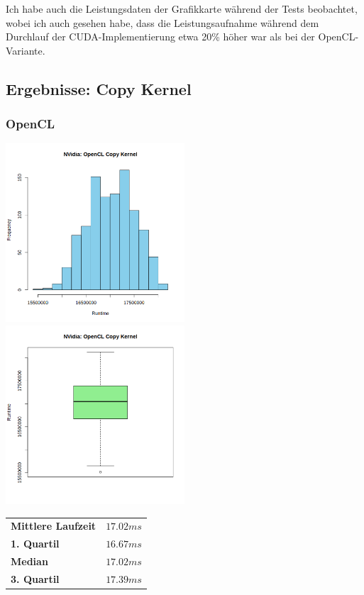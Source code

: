 \documentclass[12pt]{article}
\begin{document}
	Ich habe auch die Leistungsdaten der Grafikkarte während der Tests beobachtet, wobei ich auch gesehen habe, dass die Leistungsaufnahme während dem Durchlauf der CUDA-Implementierung etwa 20\% höher war als bei der OpenCL-Variante.
	
	

	\subsection*{Ergebnisse: Copy Kernel}
	\subsubsection*{OpenCL}
	\includegraphics[width=0.5\textwidth]{../statistics/nvidia/opencl/histogram_copy.png}
	\includegraphics[width=0.5\textwidth]{../statistics/nvidia/opencl/boxplot_copy.png}
	\\
	\begin{center}
		\begin{tabular}{|l|l|}
			\toprule
			\textbf{Mittlere Laufzeit} 		& $17.02ms$ \\
			\textbf{1. Quartil}				& $16.67ms$ \\
			\textbf{Median}					& $17.02ms$  \\
			\textbf{3. Quartil}				& $17.39ms$  \\
			\bottomrule
		\end{tabular}
	\end{center}
	
\end{document}
